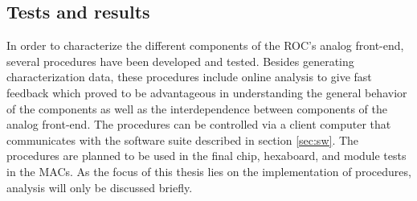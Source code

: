 \documentclass[../../main.tex]{subfiles}
\begin{document}
\subsection{Tests and results}\label{sec:tests}
In order to characterize the different components of the ROC's analog front-end, several procedures have been developed and tested. Besides generating characterization data, these procedures include online analysis to give fast feedback which proved to be advantageous in understanding the general behavior of the components as well as the interdependence between components of the analog front-end. The procedures can be controlled via a client computer that communicates with the software suite described in section \ref{sec:sw}. The procedures are planned to be used in the final chip, hexaboard, and module tests in the MACs. As the focus of this thesis lies on the implementation of procedures, analysis will only be discussed briefly.
\end{document}
